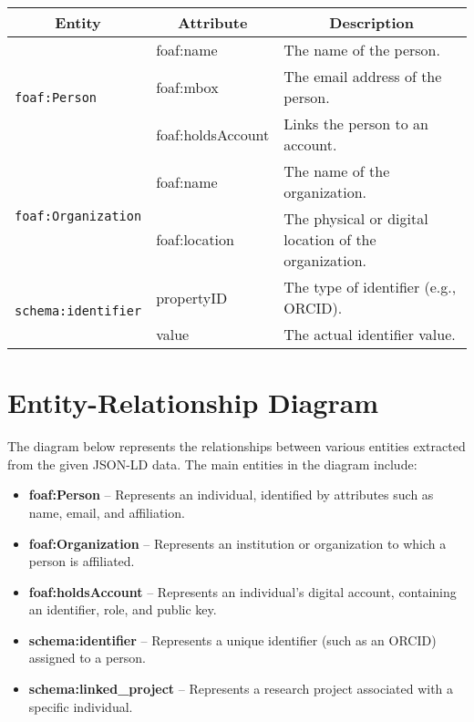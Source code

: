 \documentclass{article}
\begin{document}
\begin{longtable}{|l|l|p{8cm}|}
    \hline
    \multicolumn{1}{|c|}{\textbf{Entity}} & 
    \multicolumn{1}{c|}{\textbf{Attribute}} & 
    \multicolumn{1}{c|}{\textbf{Description}} \\
    \hline
    \multirow{3}{*}{\texttt{foaf:Person}}  
        & foaf:name & The name of the person. \\ \cline{2-3}
        & foaf:mbox & The email address of the person. \\ \cline{2-3}
        & foaf:holdsAccount & Links the person to an account. \\ 
    \hline
    \multirow{2}{*}{\texttt{foaf:Organization}}  
        & foaf:name & The name of the organization. \\ \cline{2-3}
        & foaf:location & The physical or digital location of the organization. \\ 
    \hline
    \multirow{2}{*}{\texttt{schema:identifier}}  
        & propertyID & The type of identifier (e.g., ORCID). \\ \cline{2-3}
        & value & The actual identifier value. \\ 
    \hline
    \end{longtable}


    \section{Entity-Relationship Diagram}

    The diagram below represents the relationships between various entities extracted from the given JSON-LD data. The main entities in the diagram include:
    
    \begin{itemize}
        \item \textbf{foaf:Person} – Represents an individual, identified by attributes such as name, email, and affiliation.
        \item \textbf{foaf:Organization} – Represents an institution or organization to which a person is affiliated.
        \item \textbf{foaf:holdsAccount} – Represents an individual's digital account, containing an identifier, role, and public key.
        \item \textbf{schema:identifier} – Represents a unique identifier (such as an ORCID) assigned to a person.
        \item \textbf{schema:linked_project} – Represents a research project associated with a specific individual.
    \end{itemize}
    
\end{document}
